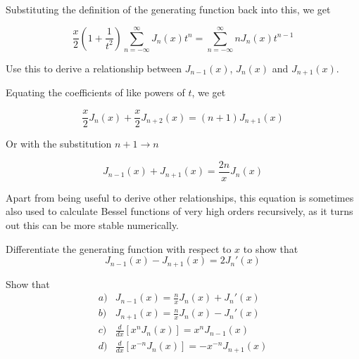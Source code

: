 Substituting the definition of the generating function back into this, we get

\begin{equation}
\frac{x}{2}\left({1 + \frac{1}{t^2}}\right) \sum_{n = - \infty}^{\infty} J_n(x)t^n = \sum_{n = - \infty}^{\infty} n J_n(x)t^{n-1}
\end{equation}

\begin{cue}
Use this to derive a relationship between $J_{n-1}(x)$, $J_{n}(x)$ and  $J_{n+1}(x)$. 
\end{cue}

\noindent{}Equating the coefficients of like powers of $t$, we get

\begin{equation}
\frac{x}{2} J_n(x) + \frac{x}{2} J_{n+2}(x) = (n+1)J_{n+1}(x)
\end{equation} 

\noindent{}Or with the substitution $n+1 \to n$

\begin{equation}
J_{n-1}(x) + J_{n+1}(x) = \frac{2n}{x} J_n(x)
\end{equation} 

Apart from being useful to derive other relationships, this equation is sometimes also used to calculate Bessel functions of very high orders recursively, as it turns out this can be more stable numerically.

\pagebreak

\begin{exer}
Differentiate the generating function with respect to $x$ to show that
$$ J_{n-1}(x) - J_{n+1}(x) = 2 J_n'(x)$$ \label{ex-recur}
\end{exer}

\begin{exer}
Show that
$$\begin{array}{lcll}a) & J_{n-1}(x) = \frac{n}{x}J_n(x) + J_n'(x) \\b) & J_{n+1}(x) = \frac{n}{x}J_n(x) - J_n'(x) \\c) & \frac{d}{dx}\left[x^n J_n(x)\right] = x^n J_{n-1}(x) \\d) & \frac{d}{dx}\left[x^{-n} J_n(x)\right] = -x^{-n} J_{n+1}(x)\end{array}$$ \label{ex-recurrence}
\end{exer}

